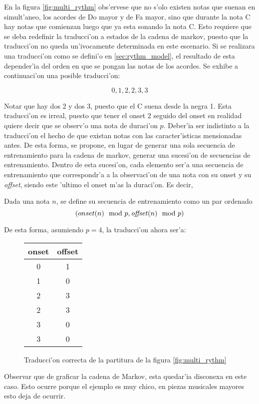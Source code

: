 \begin{imagen}
\end{imagen}

En la figura \ref{fig:multi_rythm} obs'ervese que no s'olo existen notas que suenan en simult'aneo, los acordes de Do mayor y de Fa mayor, 
sino que durante la nota C hay notas que comienzan luego que ya esta sonando la nota C. Esto requiere que se deba redefinir la traducci'on
a estados de la cadena de markov, puesto que la traducci'on no queda un'ivocamente determinada en este escenario.
Si se realizara una traducci'on como se defini'o en \ref{sec:rythm_model}, el resultado de esta depender'ia del orden en que se pongan
las notas de los acordes. Se exhibe a continuaci'on una posible traducci'on:

$$0, 1, 2, 2, 3, 3$$

Notar que hay dos 2 y dos 3, puesto que el C suena desde la negra 1. Esta traducci'on es irreal, puesto que tener el onset 2 seguido del onset 
en realidad quiere decir que se observ'o una nota de duraci'on $p$. Deber'ia ser indistinto a la traducci'on el hecho de que existan notas 
con las caracter'isticas mensionadas antes. De esta forma, se propone, en lugar de generar una sola secuencia de entrenamiento para la cadena
de markov, generar una sucesi'on de secuencias de entrenamiento. Dentro de esta sucesi'on, cada elemento ser'a una secuencia de entrenamiento
que correspondr'a a la observaci'on de una nota con su onset y su \emph{offset}, siendo este 'ultimo el onset m'as la duraci'on. Es decir, 

\begin{definition}
Dada una nota $n$, se define su secuencia de entrenamiento como un par ordenado $$(onset(n) \mod p, \text{\emph{offset}}(n)\mod p)$$
\end{definition}

De esta forma, asumiendo $p=4$, la traducci'on ahora ser'a:

\begin{figure}
\begin{center}
\begin{tabular}{c | c} 
onset & offset \\
\hline
0 & 1 \\
1 & 0 \\
2 & 3 \\
2 & 3 \\
3 & 0 \\
3 & 0 \\
\end{tabular}
\caption{ Traducci'on correcta de la partitura de la figura \ref{fig:multi_rythm}}
\label{fig:multi_rythm_translation}

\end{center}
\end{figure}

Observar que de graficar la cadena de Markov, esta quedar'ia disconexa en este caso. Esto ocurre porque el ejemplo es muy chico, en piezas musicales mayores esto deja de ocurrir.
